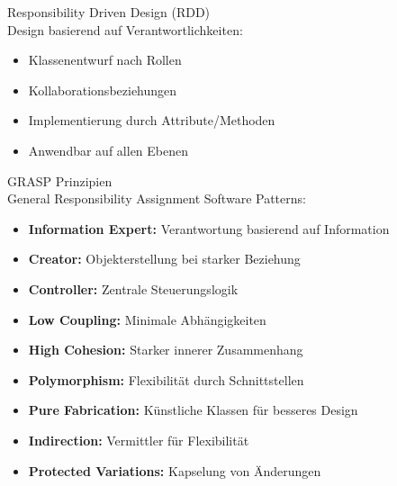 \begin{concept}{Responsibility Driven Design (RDD)}\\
Design basierend auf Verantwortlichkeiten:
\begin{itemize}
    \item Klassenentwurf nach Rollen
    \item Kollaborationsbeziehungen
    \item Implementierung durch Attribute/Methoden
    \item Anwendbar auf allen Ebenen
\end{itemize}
\end{concept}

\begin{theorem}{GRASP Prinzipien}\\
General Responsibility Assignment Software Patterns:
\begin{itemize}
    \item \textbf{Information Expert:} Verantwortung basierend auf Information
    \item \textbf{Creator:} Objekterstellung bei starker Beziehung
    \item \textbf{Controller:} Zentrale Steuerungslogik
    \item \textbf{Low Coupling:} Minimale Abhängigkeiten
    \item \textbf{High Cohesion:} Starker innerer Zusammenhang
    \item \textbf{Polymorphism:} Flexibilität durch Schnittstellen
    \item \textbf{Pure Fabrication:} Künstliche Klassen für besseres Design
    \item \textbf{Indirection:} Vermittler für Flexibilität
    \item \textbf{Protected Variations:} Kapselung von Änderungen
\end{itemize}
\end{theorem}

